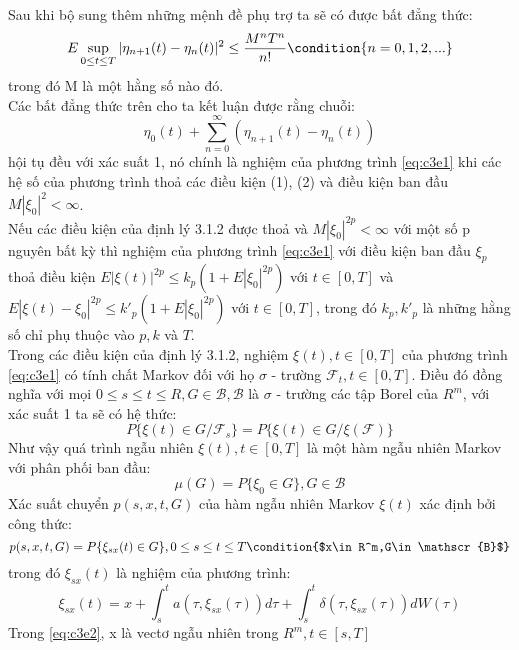 \documentclass[12pt,a4paper]{article}
\begin{document}
Sau khi bộ sung thêm những mệnh đề phụ trợ ta sẽ có được bất đẳng thức:
\begin{equation*}
	E\sup_{0\leq t\leq T}|\eta_{n+1}(t)-\eta_n(t)|^2\leq\frac{M^nT^n}{n!} \condition{n=0,1,2,...}
\end{equation*}
trong đó M là một hằng số nào đó.\\
Các bất đẳng thức trên cho ta kết luận được rằng chuỗi:
\begin{equation*}
	\eta_0(t)+\sum_{n=0}^\infty(\eta_{n+1}(t)-\eta_n(t))
\end{equation*}
hội tụ đều với xác suất 1, nó chính là nghiệm của phương trình \eqref{eq:c3e1} khi các hệ số của phương trình thoả các điều kiện (1), (2) và điều kiện ban đầu $M|\xi_0|^2<\infty$.\\
Nếu các điều kiện của định lý 3.1.2 được thoả và $M|\xi_0|^{2p}<\infty$ với một số p nguyên bất kỳ thì nghiệm của phương trình \eqref{eq:c3e1} với điều kiện ban đầu $\xi_p$ thoả điều kiện $E|\xi(t)|^{2p}\leq k_p(1+E|\xi_0|^{2p})$ với $t\in[0,T]$ và $E|\xi(t)-\xi_0|^{2p}\leq k'_p(1+E|\xi_0|^{2p})$ với $t\in[0,T]$, trong đó $k_p,k'_p$ là những hằng số chỉ phụ thuộc vào $p,k$ và $T$.\\
Trong các điều kiện của định lý 3.1.2, nghiệm $\xi(t),t\in[0,T]$ của phương trình \eqref{eq:c3e1} có tính chất Markov đối với họ $\sigma$ - trường ${\mathscr{F}_t,t\in[0,T]}$. Điều đó đồng nghĩa với mọi $0\leq s\leq t\leq R,G\in \mathscr{B},\mathscr{B}$ là $\sigma$ - trường các tập Borel của $R^m$, với xác suất 1 ta sẽ có hệ thức:
\begin{equation*}
	P\{\xi(t)\in G/\mathscr{F}_s\}=P\{\xi(t)\in G/\xi(\mathscr{F})\}
\end{equation*}
Như vậy quá trình ngẫu nhiên $\xi(t),t\in[0,T]$ là một hàm ngẫu nhiên Markov với phân phối ban đầu:
\begin{equation*}
	\mu(G)=P\{\xi_0\in G\},G\in \mathscr{B}
\end{equation*}
Xác suất chuyển $p(s,x,t,G)$ của hàm ngẫu nhiên Markov $\xi(t)$ xác định bởi công thức:
\begin{equation*}
	p(s,x,t,G)=P\{\xi_{sx}(t)\in G\},0\leq s\leq t\leq T \condition{$x\in R^m,G\in\mathscr{B}$}
\end{equation*}
trong đó $\xi_{sx}(t)$ là nghiệm của phương trình:
\begin{equation}\label{eq:c3e2}
	\xi_{sx}(t)=x+\int_{s}^{t}a(\tau,\xi_{sx}(\tau))d\tau+\int_{s}^{t}\delta(\tau,\xi_{sx}(\tau))dW(\tau)
\end{equation}
Trong \eqref{eq:c3e2}, x là vectơ ngẫu nhiên trong $R^m,t\in[s,T]$\\
\end{document}
